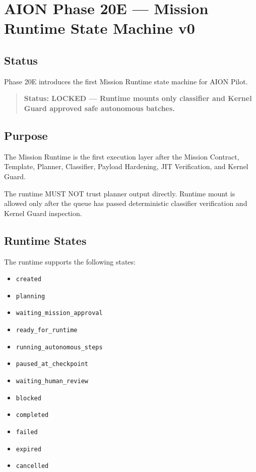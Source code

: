 \section{AION Phase 20E --- Mission Runtime State Machine v0}
\label{sec:aion-phase20e-mission-runtime}

\subsection{Status}

Phase 20E introduces the first Mission Runtime state machine for AION Pilot.

\begin{quote}
\textbf{Status: LOCKED --- Runtime mounts only classifier and Kernel Guard approved safe autonomous batches.}
\end{quote}

\subsection{Purpose}

The Mission Runtime is the first execution layer after the Mission Contract, Template, Planner, Classifier, Payload Hardening, JIT Verification, and Kernel Guard.

The runtime MUST NOT trust planner output directly. Runtime mount is allowed only after the queue has passed deterministic classifier verification and Kernel Guard inspection.

\subsection{Runtime States}

The runtime supports the following states:

\begin{itemize}
  \item \texttt{created}
  \item \texttt{planning}
  \item \texttt{waiting\_mission\_approval}
  \item \texttt{ready\_for\_runtime}
  \item \texttt{running\_autonomous\_steps}
  \item \texttt{paused\_at\_checkpoint}
  \item \texttt{waiting\_human\_review}
  \item \texttt{blocked}
  \item \texttt{completed}
  \item \texttt{failed}
  \item \texttt{expired}
  \item \texttt{cancelled}
\end{itemize}


